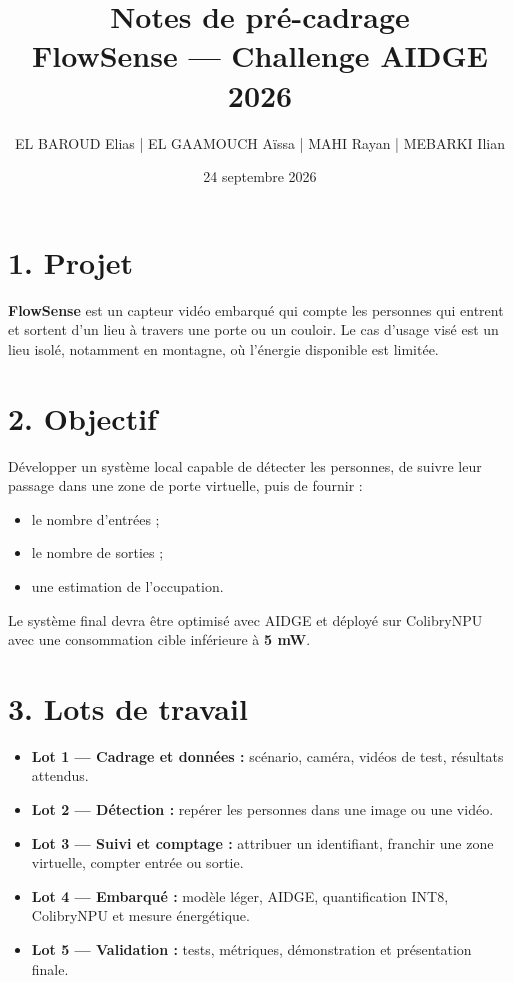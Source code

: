 \documentclass[11pt,a4paper]{article}
\title{\vspace{-1.4cm}\textbf{Notes de pré-cadrage}\\[0.2cm]
\large FlowSense --- Challenge AIDGE 2026}
\author{EL BAROUD Elias \quad | \quad EL GAAMOUCH Aïssa \quad | \quad MAHI Rayan \quad | \quad MEBARKI Ilian}
\date{24 septembre 2026}
\begin{document}
\maketitle
\thispagestyle{empty}

\section*{1. Projet}

\textbf{FlowSense} est un capteur vidéo embarqué qui compte les personnes qui entrent et sortent d'un lieu à travers une porte ou un couloir. Le cas d'usage visé est un lieu isolé, notamment en montagne, où l'énergie disponible est limitée.

\section*{2. Objectif}

Développer un système local capable de détecter les personnes, de suivre leur passage dans une zone de porte virtuelle, puis de fournir :

\begin{itemize}
    \item le nombre d'entrées ;
    \item le nombre de sorties ;
    \item une estimation de l'occupation.
\end{itemize}

Le système final devra être optimisé avec AIDGE et déployé sur ColibryNPU avec une consommation cible inférieure à \textbf{5 mW}.

\section*{3. Lots de travail}

\begin{itemize}
    \item \textbf{Lot 1 --- Cadrage et données :} scénario, caméra, vidéos de test, résultats attendus.
    \item \textbf{Lot 2 --- Détection :} repérer les personnes dans une image ou une vidéo.
    \item \textbf{Lot 3 --- Suivi et comptage :} attribuer un identifiant, franchir une zone virtuelle, compter entrée ou sortie.
    \item \textbf{Lot 4 --- Embarqué :} modèle léger, AIDGE, quantification INT8, ColibryNPU et mesure énergétique.
    \item \textbf{Lot 5 --- Validation :} tests, métriques, démonstration et présentation finale.
\end{itemize}
\end{document}
